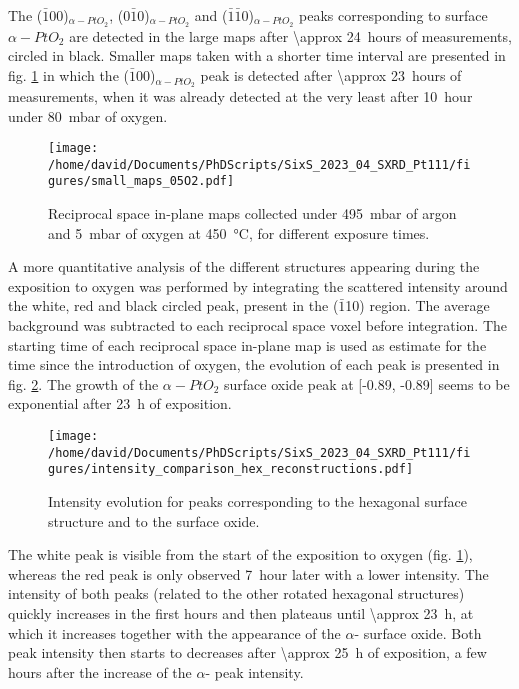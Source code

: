 The ($\bar{1}0$0)$_{\alpha-PtO_2}$, ($0\bar{1}$0)$_{\alpha-PtO_2}$ and ($\bar{1}\bar{1}$0)$_{\alpha-PtO_2}$ peaks corresponding to surface ${\alpha-PtO_2}$ are detected in the large maps after \qty{\approx 24}{hours} of measurements, circled in black.
Smaller maps taken with a shorter time interval are presented in fig. \ref{fig:SmallMapsPt111LowOxygen} in which the ($\bar{1}0$0)$_{\alpha-PtO_2}$ peak is detected after \qty{\approx 23}{hours} of measurements, when it was already detected at the very least after \qty{10}{hour} under \qty{80}{\milli\bar} of oxygen.

\begin{figure}[!htb]
    \centering
    \texttt{[image: /home/david/Documents/PhDScripts/SixS\_2023\_04\_SXRD\_Pt111/figures/small\_maps\_05O2.pdf]}
    \caption{
        Reciprocal space in-plane maps collected under \qty{495}{\milli\bar} of argon and \qty{5}{\milli\bar} of oxygen at \qty{450}{\degreeCelsius}, for different exposure times.
    }
    \label{fig:SmallMapsPt111LowOxygen}
\end{figure}

A more quantitative analysis of the different structures appearing during the exposition to oxygen was performed by integrating the scattered intensity around the white, red and black circled peak, present in the ($\bar{1}$10) region.
The average background was subtracted to each reciprocal space voxel before integration.
The starting time of each reciprocal space in-plane map is used as estimate for the time since the introduction of oxygen, the evolution of each peak is presented in fig. \ref{fig:HexBraggPeaks}.
The growth of the ${\alpha-PtO_2}$ surface oxide peak at [-0.89, -0.89] seems to be exponential after \qty{23}{\hour} of exposition.

\begin{figure}[!htb]
    \centering
    \texttt{[image: /home/david/Documents/PhDScripts/SixS\_2023\_04\_SXRD\_Pt111/figures/intensity\_comparison\_hex\_reconstructions.pdf]}
    \caption{
        Intensity evolution for peaks corresponding to the hexagonal surface structure and to the surface oxide.
    }
    \label{fig:HexBraggPeaks}
\end{figure}

The white peak is visible from the start of the exposition to oxygen (fig. \ref{fig:SmallMapsPt111LowOxygen}), whereas the red peak is only observed \qty{7}{hour} later with a lower intensity.
The intensity of both peaks (related to the other rotated hexagonal structures) quickly increases in the first hours and then plateaus until \qty{\approx 23}{\hour}, at which it increases together with the appearance of the $\alpha$- surface oxide.
Both peak intensity then starts to decreases after \qty{\approx 25}{\hour} of exposition, a few hours after the increase of the $\alpha$- peak intensity.

